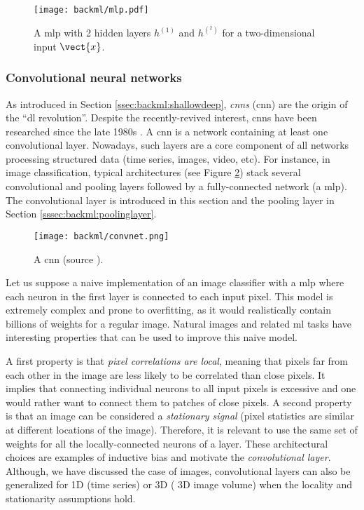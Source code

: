 \begin{figure}
  \centering
  \texttt{[image: backml/mlp.pdf]}
  \caption{A \acrlong{mlp} with 2 hidden layers $h^{(1)}$ and $h^{(^2)}$ for a two-dimensional input $\vect{x}$.}
  \label{fig:backml:mlp}
\end{figure}

\subsubsection{Convolutional neural networks}
\label{sssec:backml:dl:cnn}

As introduced in Section \ref{ssec:backml:shallowdeep}, \textit{\acrlong{cnn}s}
(\acrshort{cnn}) are the origin of the ``\acrlong{dl} revolution''. Despite the
recently-revived interest, \acrshort{cnn}s have been researched since the late
1980s \cite{lecun1989handwritten}. A \acrshort{cnn} is a network containing
at least one convolutional layer. Nowadays, such layers are a core component of
all networks processing structured data (time series, images, video, etc). For
instance, in image classification, typical architectures (see Figure \ref{fig:backml:cnn})
stack several convolutional and pooling layers followed by a fully-connected
network (\ie a \acrshort{mlp}). The convolutional layer is introduced in this
section and the pooling layer in Section \ref{sssec:backml:poolinglayer}.

\begin{figure}
  \centering
  \texttt{[image: backml/convnet.png]}
  \caption{A \acrlong{cnn} (source \cite{millar2019using}).}
  \label{fig:backml:cnn}
\end{figure}

Let us suppose a naive implementation of an image classifier with a \acrshort{mlp}
where each neuron in the first layer is connected to each input pixel. This model
is extremely complex and prone to overfitting, as it would realistically contain
billions of weights for a regular image. Natural images and related \acrlong{ml}
tasks have interesting properties that can be used to improve this naive model.

A first property is that \textit{pixel correlations are local}, meaning that pixels
far from each other in the image are less likely to be correlated than close
pixels. It implies that connecting individual neurons to all input pixels is
excessive and one would rather want to connect them to patches of close pixels.
A second property is that an image can be considered a \textit{stationary signal}
(\ie pixel statistics are similar at different locations of the image). Therefore,
it is relevant to use the same set of weights for all the locally-connected neurons
of a layer. These architectural choices are examples of inductive bias and motivate
the \textit{convolutional layer}. Although, we have discussed the case of images,
convolutional layers can also be generalized for 1D (\eg time series) or 3D (\eg
3D image volume) when the locality and stationarity assumptions hold.

